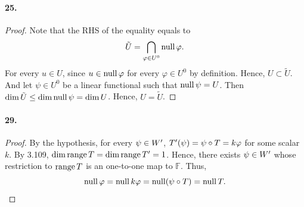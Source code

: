   \paragraph{25.}
  \begin{proof}
    Note that the RHS of the equality equals to
    \[
      \tilde{U} = \bigcap_{\varphi\in U^0}\operatorname{null}\varphi.
    \]
    For every $u\in U$, since $u\in\operatorname{null}\varphi$ for every $\varphi\in U^0$ by 
    definition. Hence, $U\subset\tilde{U}$. And let $\psi\in U^0$ be a linear 
    functional such that $\operatorname{null}\psi = U$. Then $\dim\tilde{U}\le\dim\operatorname{null}\psi=
    \dim U$. Hence, $U=\tilde{U}$.
  \end{proof}

  \paragraph{29.}
  \begin{proof}
    By the hypothesis, for every $\psi\in W^\prime$, $T^\prime(\psi)=\psi\circ T
    =k\varphi$ for some scalar $k$. By 3.109, $\dim\operatorname{range} T =\dim\operatorname{range} T^\prime=1$.
    Hence, there exists $\psi\in W^\prime$ whose restriction to $\operatorname{range} T$ is an 
    one-to-one map to $\mathbb{F}$. Thus,
    \[
      \operatorname{null}\varphi = \operatorname{null} k\varphi = \operatorname{null}(\psi\circ T) = \operatorname{null} T.  
    \]
  \end{proof}

